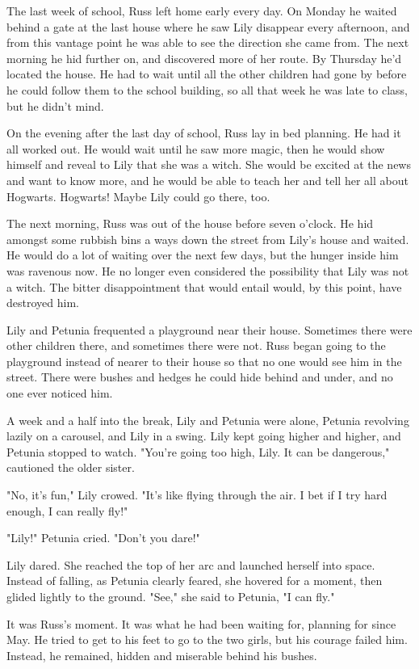 The last week of school, Russ left home early every day. On Monday he waited behind a gate at the last house where he saw Lily disappear every afternoon, and from this vantage point he was able to see the direction she came from. The next morning he hid further on, and discovered more of her route. By Thursday he'd located the house. He had to wait until all the other children had gone by before he could follow them to the school building, so all that week he was late to class, but he didn't mind.

On the evening after the last day of school, Russ lay in bed planning. He had it all worked out. He would wait until he saw more magic, then he would show himself and reveal to Lily that she was a witch. She would be excited at the news and want to know more, and he would be able to teach her and tell her all about Hogwarts. Hogwarts! Maybe Lily could go there, too.

The next morning, Russ was out of the house before seven o'clock. He hid amongst some rubbish bins a ways down the street from Lily's house and waited. He would do a lot of waiting over the next few days, but the hunger inside him was ravenous now. He no longer even considered the possibility that Lily was not a witch. The bitter disappointment that would entail would, by this point, have destroyed him.

Lily and Petunia frequented a playground near their house. Sometimes there were other children there, and sometimes there were not. Russ began going to the playground instead of nearer to their house so that no one would see him in the street. There were bushes and hedges he could hide behind and under, and no one ever noticed him.

A week and a half into the break, Lily and Petunia were alone, Petunia revolving lazily on a carousel, and Lily in a swing. Lily kept going higher and higher, and Petunia stopped to watch. "You're going too high, Lily. It can be dangerous," cautioned the older sister.

"No, it's fun," Lily crowed. "It's like flying through the air. I bet if I try hard enough, I can really fly!"

"Lily!" Petunia cried. "Don't you dare!"

Lily dared. She reached the top of her arc and launched herself into space. Instead of falling, as Petunia clearly feared, she hovered for a moment, then glided lightly to the ground. "See," she said to Petunia, "I can fly."

It was Russ's moment. It was what he had been waiting for, planning for since May. He tried to get to his feet to go to the two girls, but his courage failed him. Instead, he remained, hidden and miserable behind his bushes.

